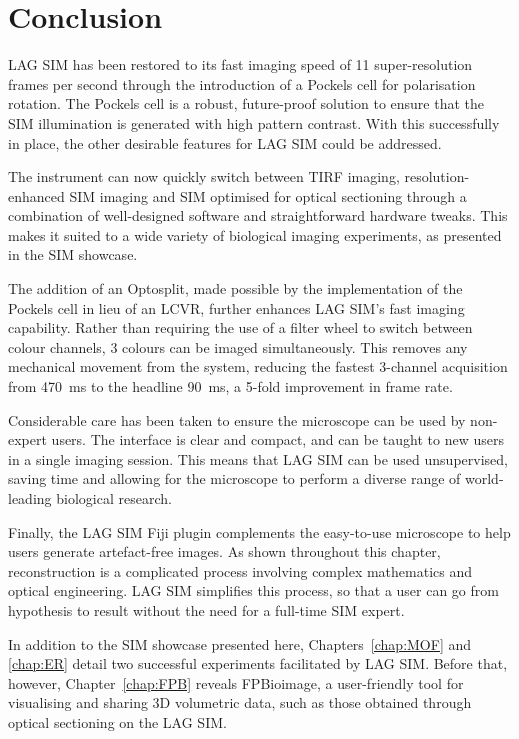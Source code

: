 \section{Conclusion}
LAG SIM has been restored to its fast imaging speed of 11 super-resolution frames per second through the introduction of a Pockels cell for polarisation rotation. 
The Pockels cell is a robust, future-proof solution to ensure that the SIM illumination is generated with high pattern contrast. 
With this successfully in place, the other desirable features for LAG SIM could be addressed. 

The instrument can now quickly switch between TIRF imaging, resolution-enhanced SIM imaging and SIM optimised for optical sectioning through a combination of well-designed software and straightforward hardware tweaks. 
This makes it suited to a wide variety of biological imaging experiments, as presented in the SIM showcase. 

The addition of an Optosplit, made possible by the implementation of the Pockels cell in lieu of an LCVR, further enhances LAG SIM's fast imaging capability. 
Rather than requiring the use of a filter wheel to switch between colour channels, 3 colours can be imaged simultaneously. 
This removes any mechanical movement from the system, reducing the fastest 3-channel acquisition from \SI{470}{\milli\second} to the headline \SI{90}{\milli\second}, a 5-fold improvement in frame rate. 

Considerable care has been taken to ensure the microscope can be used by non-expert users. 
The interface is clear and compact, and can be taught to new users in a single imaging session. 
This means that LAG SIM can be used unsupervised, saving time and allowing for the microscope to perform a diverse range of world-leading biological research.

Finally, the LAG SIM Fiji plugin complements the easy-to-use microscope to help users generate artefact-free images. 
As shown throughout this chapter, reconstruction is a complicated process involving complex mathematics and optical engineering. 
LAG SIM simplifies this process, so that a user can go from hypothesis to result without the need for a full-time SIM expert. 

In addition to the SIM showcase presented here, Chapters~\ref{chap:MOF} and \ref{chap:ER} detail two successful experiments facilitated by LAG SIM. 
Before that, however, Chapter~\ref{chap:FPB} reveals FPBioimage, a user-friendly tool for visualising and sharing 3D volumetric data, such as those obtained through optical sectioning on the LAG SIM. 